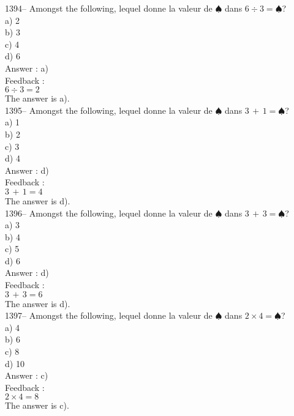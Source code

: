 ﻿\documentclass[letterpaper, 12pt]{article}
\begin{document}
1394-- Amongst the following, lequel donne la valeur de
$\spadesuit$ dans $6\div3=\spadesuit$?\\
a) 2\\
b) 3\\
c) 4\\
d) 6\\

Answer : a)\\

Feedback : \\
$6\div3=2$\\
The answer is a).\\

1395-- Amongst the following, lequel donne la valeur de
$\spadesuit$ dans $3\,+\,1=\spadesuit$?\\
a) 1\\
b) 2\\
c) 3\\
d) 4\\

Answer : d)\\

Feedback : \\
$3\,+\,1=4$\\
The answer is d).\\

1396-- Amongst the following, lequel donne la valeur de
$\spadesuit$ dans $3\,+\,3=\spadesuit$?\\
a) 3\\
b) 4\\
c) 5\\
d) 6\\

Answer : d)\\

Feedback : \\
$3\,+\,3=6$\\
The answer is d).\\

1397-- Amongst the following, lequel donne la valeur de
$\spadesuit$ dans $2\times4=\spadesuit$?\\
a) 4\\
b) 6\\
c) 8\\
d) 10\\

Answer : c)\\

Feedback : \\
$2\times4=8$\\
The answer is c).\\
\end{document}
